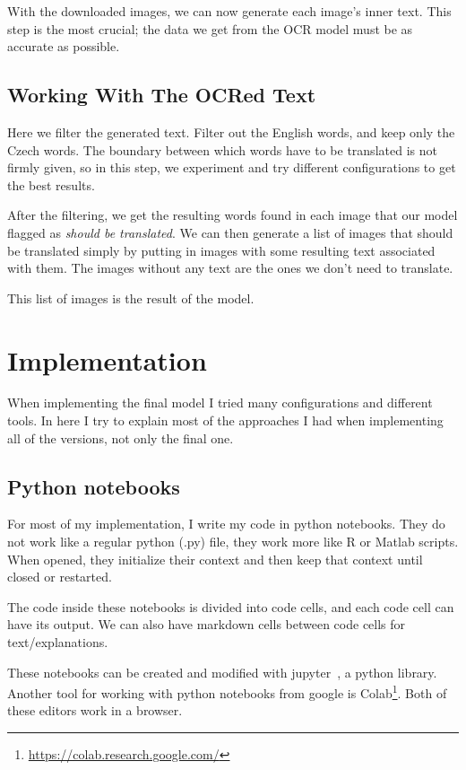 \documentclass[
  digital,     %
  oneside,     %
  nosansbold,  %
  nocolorbold, %
  nolof,         %
  nolot,         %
]{fithesis4}
\begin{document}
With the downloaded images, we can now generate each image's inner text. This step is the most crucial; the data we get from the OCR model must be as accurate as possible.

\section{Working With The OCRed Text}

Here we filter the generated text. Filter out the English words, and keep only the Czech words. The boundary between which words have to be translated is not firmly given, so in this step, we experiment and try different configurations to get the best results.

After the filtering, we get the resulting words found in each image that our model flagged as \emph{should be translated}. We can then generate a list of images that should be translated simply by putting in images with some resulting text associated with them. The images without any text are the ones we don't need to translate.

This list of images is the result of the model.

\chapter{Implementation}\label{chap:implementation}

When implementing the final model I tried many configurations and different tools. In here I try to explain most of the approaches I had when implementing all of the versions, not only the final one.

\section{Python notebooks}

For most of my implementation, I write my code in python notebooks. They do not work like a regular python (.py) file, they work more like R or Matlab scripts. When opened, they initialize their context and then keep that context until closed or restarted.

The code inside these notebooks is divided into code cells, and each code cell can have its output. We can also have markdown cells between code cells for text/explanations.

These notebooks can be created and modified with jupyter~\cite{jupyter}, a python library. Another tool for working with python notebooks from google is Colab\footnote{\href{https://colab.research.google.com/}{https://colab.research.google.com/}}. Both of these editors work in a browser.
\end{document}
